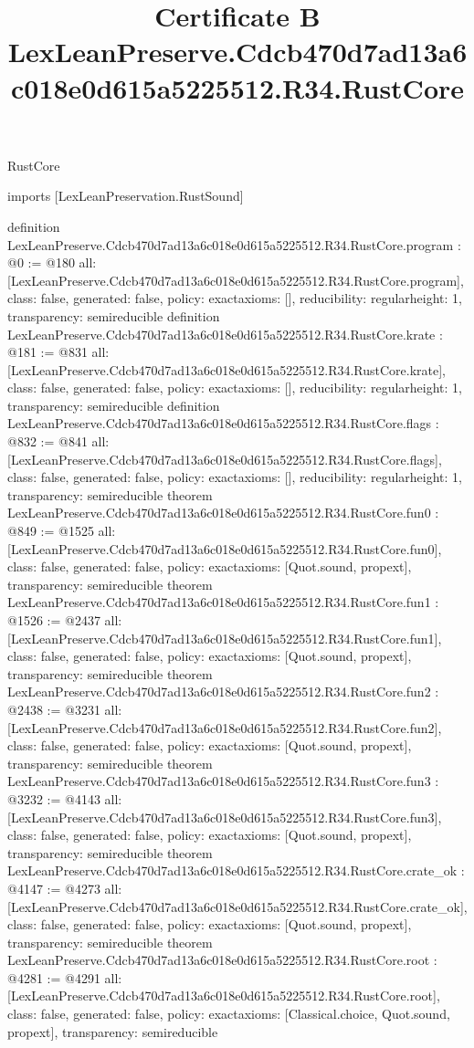 \begin{lexlean}{RustCore}
\title{Certificate B LexLeanPreserve.Cdcb470d7ad13a6c018e0d615a5225512.R34.RustCore}
\begin{coremodule}
imports [LexLeanPreservation.RustSound]

definition LexLeanPreserve.Cdcb470d7ad13a6c018e0d615a5225512.R34.RustCore.program : @0 := @180 {
  all: [LexLeanPreserve.Cdcb470d7ad13a6c018e0d615a5225512.R34.RustCore.program],
  class: false,
  generated: false,
  policy: exact{axioms: []},
  reducibility: regular{height: 1},
  transparency: semireducible
}
definition LexLeanPreserve.Cdcb470d7ad13a6c018e0d615a5225512.R34.RustCore.krate : @181 := @831 {
  all: [LexLeanPreserve.Cdcb470d7ad13a6c018e0d615a5225512.R34.RustCore.krate],
  class: false,
  generated: false,
  policy: exact{axioms: []},
  reducibility: regular{height: 1},
  transparency: semireducible
}
definition LexLeanPreserve.Cdcb470d7ad13a6c018e0d615a5225512.R34.RustCore.flags : @832 := @841 {
  all: [LexLeanPreserve.Cdcb470d7ad13a6c018e0d615a5225512.R34.RustCore.flags],
  class: false,
  generated: false,
  policy: exact{axioms: []},
  reducibility: regular{height: 1},
  transparency: semireducible
}
theorem LexLeanPreserve.Cdcb470d7ad13a6c018e0d615a5225512.R34.RustCore.fun0 : @849 := @1525 {
  all: [LexLeanPreserve.Cdcb470d7ad13a6c018e0d615a5225512.R34.RustCore.fun0],
  class: false,
  generated: false,
  policy: exact{axioms: [Quot.sound, propext]},
  transparency: semireducible
}
theorem LexLeanPreserve.Cdcb470d7ad13a6c018e0d615a5225512.R34.RustCore.fun1 : @1526 := @2437 {
  all: [LexLeanPreserve.Cdcb470d7ad13a6c018e0d615a5225512.R34.RustCore.fun1],
  class: false,
  generated: false,
  policy: exact{axioms: [Quot.sound, propext]},
  transparency: semireducible
}
theorem LexLeanPreserve.Cdcb470d7ad13a6c018e0d615a5225512.R34.RustCore.fun2 : @2438 := @3231 {
  all: [LexLeanPreserve.Cdcb470d7ad13a6c018e0d615a5225512.R34.RustCore.fun2],
  class: false,
  generated: false,
  policy: exact{axioms: [Quot.sound, propext]},
  transparency: semireducible
}
theorem LexLeanPreserve.Cdcb470d7ad13a6c018e0d615a5225512.R34.RustCore.fun3 : @3232 := @4143 {
  all: [LexLeanPreserve.Cdcb470d7ad13a6c018e0d615a5225512.R34.RustCore.fun3],
  class: false,
  generated: false,
  policy: exact{axioms: [Quot.sound, propext]},
  transparency: semireducible
}
theorem LexLeanPreserve.Cdcb470d7ad13a6c018e0d615a5225512.R34.RustCore.crate_ok : @4147 := @4273 {
  all: [LexLeanPreserve.Cdcb470d7ad13a6c018e0d615a5225512.R34.RustCore.crate_ok],
  class: false,
  generated: false,
  policy: exact{axioms: [Quot.sound, propext]},
  transparency: semireducible
}
theorem LexLeanPreserve.Cdcb470d7ad13a6c018e0d615a5225512.R34.RustCore.root : @4281 := @4291 {
  all: [LexLeanPreserve.Cdcb470d7ad13a6c018e0d615a5225512.R34.RustCore.root],
  class: false,
  generated: false,
  policy: exact{axioms: [Classical.choice, Quot.sound, propext]},
  transparency: semireducible
}


\end{coremodule}
\end{lexlean}
